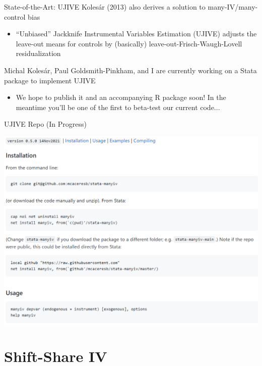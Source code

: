 \documentclass{beamer}
\begin{document}
\begin{frame}{State-of-the-Art: UJIVE}
 Koles\'{a}r (2013) also derives a solution to many-IV/many-control bias \smallskip
\begin{itemize}
\item ``Unbiased'' Jackknife Instrumental Variables Estimation (UJIVE) adjusts the leave-out means for controls by (basically) leave-out-Frisch-Waugh-Lovell residualization
\end{itemize}\bigskip\pause{}
Michal Koles\'{a}r, Paul Goldsmith-Pinkham, and I are currently working on a Stata package to implement UJIVE  \smallskip
\begin{itemize}
\item We hope to publish it and an accompanying R package soon! In the meantime you'll be one of the first to beta-test our current code...
\end{itemize}
\end{frame}

\begin{frame}{UJIVE Repo (In Progress)}
\begin{center}
\includegraphics[scale=0.45]{./lecture_includes/manyiv.png}
\end{center}
\end{frame}



\section{Shift-Share IV}
\end{document}

